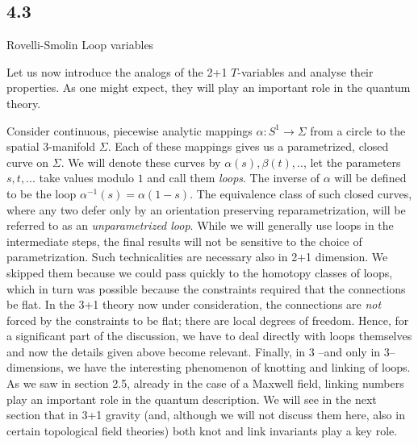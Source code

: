 \goodbreak
\subsection{4.3}{Rovelli-Smolin Loop variables}

Let us now introduce the analogs of the 2+1 $T$-variables and analyse
their properties. As one might expect, they will play an important role
in the quantum theory.

Consider continuous, piecewise analytic mappings $\alpha: S^1 \to \Sigma$
from a circle to the spatial 3-manifold $\Sigma$. Each of these mappings
gives us a parametrized, closed curve on $\Sigma$. We will denote these
curves by $\alpha(s), \beta(t),..$, let the parameters $s,t,...$ take
values modulo $1$ and call them {\it loops}. The inverse of $\alpha$ will be
defined to be the loop $\alpha^{-1}(s) = \alpha (1-s)$. The equivalence
class of such closed curves, where any two defer only by an orientation
preserving reparametrization, will be referred to as an {\it unparametrized
loop}. While we will generally use loops in the intermediate steps, the final
results will not be sensitive to the choice of parametrization. Such
technicalities
are necessary also in 2+1 dimension. We skipped them because we could
pass quickly to the homotopy classes of loops, which in turn was possible
because the constraints required that the connections be flat. In the
3+1 theory now under consideration, the connections are {\it not} forced
by the constraints to be flat; there are local degrees of freedom. Hence,
for a significant part of the discussion, we have to deal directly with
loops themselves and now the details given above become relevant. Finally,
in 3 --and only in 3-- dimensions, we have the interesting phenomenon of
knotting and linking of loops. As we saw in section 2.5, already in the
case of a Maxwell field, linking numbers play an important role in the
quantum description. We will see in the next section that in 3+1 gravity
(and, although we will not discuss them here, also in certain topological
field theories) both knot and link invariants play a key role.

